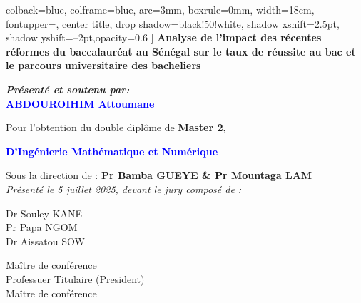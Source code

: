 \documentclass[a4paper,12pt]{report}                %
\begin{document}
\begin{titlepage}
\begin{center}
\begin{tcolorbox}
            colback=blue,
            colframe=blue,
            arc=3mm,
            boxrule=0mm,
            width=18cm,
            fontupper=\color{white}, 
            center title, 
            drop shadow={black!50!white, shadow xshift=2.5pt, shadow yshift=--2pt,opacity=0.6}
            ]
            \centering
            \textbf{\LARGE Analyse de l'impact des récentes réformes du baccalauréat au Sénégal sur le taux de réussite au bac et le parcours universitaire des bacheliers}
        \end{tcolorbox}
        \vspace{1.5cm}
        \textbf{\textit{\large Présenté et soutenu par:}}\\[0.5cm]
        \textcolor{blue}{\textbf{\LARGE ABDOUROIHIM Attoumane}}
    \end{center}
    \vspace{1cm}
    \begin{flushleft}
        \hspace{0.5cm} 
        \textmd{\large Pour l'obtention du double diplôme de \textbf{\Large Master 2},}
        \begin{center}
            \textmd{\Large \textcolor{blue}{\textbf{D'Ingénierie Mathématique et Numérique}}}
        \end{center}
        \vspace{0.5cm}
        \hspace{0.5cm}
        \textmd{\large Sous la direction de : \textbf{\Large Pr Bamba GUEYE \& Pr Mountaga LAM}}\\  
        \vspace{1cm}
        \hspace{1cm}
        \textit{\large Présenté le 5 juillet 2025, devant le jury composé de :}\\
        \vspace{0.5cm}
        \begin{center}
        \hspace{3cm}
        \begin{minipage}{0.3\textwidth}
            \textmd{\Large Dr Souley KANE }\\[0.3cm]
            \textmd{\Large Pr Papa NGOM}\\[0.3cm]
            \textmd{\Large Dr Aissatou SOW}
        \end{minipage}
        \hfill
        \begin{minipage}{0.4\textwidth}
            \textmd{\large Maître de conférence}\\[0.3cm]
            \textmd{\large Professuer Titulaire (President)}\\[0.3cm]
            \textmd{\large Maître de conférence}
        \end{minipage}
    \end{center}
    \end{flushleft}
    
\end{titlepage}
\end{document}
